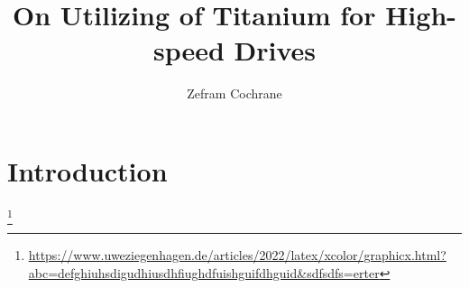 \documentclass[12pt,english,twocolumn]{article}
\author{Zefram Cochrane}
\title{On Utilizing of Titanium for High-speed Drives}
\begin{document}
\maketitle

\section{Introduction}

\blindtext[2]\footnote{\url{https://www.uweziegenhagen.de/articles/2022/latex/xcolor/graphicx.html?abc=defghiuhsdigudhiusdhfiughdfuishguifdhguid&sdfsdfs=erter}}

\blindtext[2]

\blindtext[2]

\blindtext[2]
\end{document}
